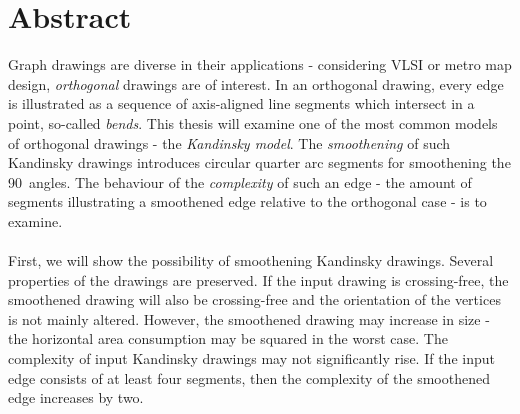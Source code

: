 \section*{Abstract}
Graph drawings are diverse in their applications - considering VLSI or metro map design, \textit{orthogonal} drawings are of interest. In an orthogonal drawing, every edge is illustrated as a sequence of axis-aligned line segments which intersect in a point, so-called \textit{bends}. This thesis will examine one of the most common models of orthogonal drawings - the \textit{Kandinsky model}. The \textit{smoothening} of such Kandinsky drawings introduces circular quarter arc segments for smoothening the 90\degree~angles. The behaviour of the \textit{complexity} of such an edge - the amount of segments illustrating a smoothened edge relative to the orthogonal case - is to examine. 
\\\\
First, we will show the possibility of smoothening Kandinsky drawings. Several properties of the drawings are preserved. If the input drawing is crossing-free, the smoothened drawing will also be crossing-free and the orientation of the vertices is not mainly altered. However, the smoothened drawing may increase in size - the horizontal area consumption may be squared in the worst case. The complexity of input Kandinsky drawings may not significantly rise. If the input edge consists of at least four segments, then the complexity of the smoothened edge increases by two.
